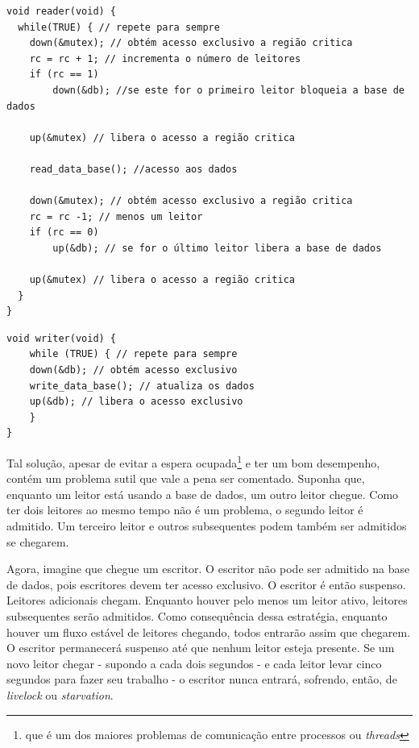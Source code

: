 \begin{minipage}[t]{0.45\linewidth}
\begin{lstlisting}[style=C]
void reader(void) {
  while(TRUE) { // repete para sempre
    down(&mutex); // obtém acesso exclusivo a região critica
    rc = rc + 1; // incrementa o número de leitores
    if (rc == 1) 
    	down(&db); //se este for o primeiro leitor bloqueia a base de dados

    up(&mutex) // libera o acesso a região critica

    read_data_base(); //acesso aos dados

    down(&mutex); // obtém acesso exclusivo a região critica
    rc = rc -1; // menos um leitor
    if (rc == 0) 
    	up(&db); // se for o último leitor libera a base de dados

    up(&mutex) // libera o acesso a região critica
  }
}
\end{lstlisting}
\end{minipage}
%
\begin{minipage}[t]{0.45\linewidth}
\begin{lstlisting}[style=C]
void writer(void) {
	while (TRUE) { // repete para sempre
	down(&db); // obtém acesso exclusivo
	write_data_base(); // atualiza os dados
	up(&db); // libera o acesso exclusivo
	}
}
\end{lstlisting}
\end{minipage}

	Tal solução, apesar de evitar a espera ocupada\footnote{que é um dos maiores problemas de comunicação entre processos ou \textit{threads}} e ter um bom desempenho, contém um problema sutil que vale a pena ser comentado. Suponha que, enquanto um leitor está usando a base de dados, um outro leitor chegue. Como ter dois leitores ao mesmo tempo não é um problema, o segundo leitor é admitido. Um terceiro leitor e outros subsequentes podem também ser admitidos se chegarem.
	
	Agora, imagine que chegue um escritor. O escritor não pode ser admitido na base de dados, pois escritores devem ter acesso exclusivo. O escritor é então suspenso. Leitores adicionais chegam. Enquanto houver pelo menos um leitor ativo, leitores subsequentes serão admitidos. Como consequência dessa estratégia, enquanto houver um fluxo estável de leitores chegando, todos entrarão assim que chegarem. O escritor permanecerá suspenso até que nenhum leitor esteja presente. Se um novo leitor chegar - supondo a cada dois segundos - e cada leitor levar cinco segundos para fazer seu trabalho - o escritor nunca entrará, sofrendo, então, de \textit{livelock} ou \textit{starvation}.
	
